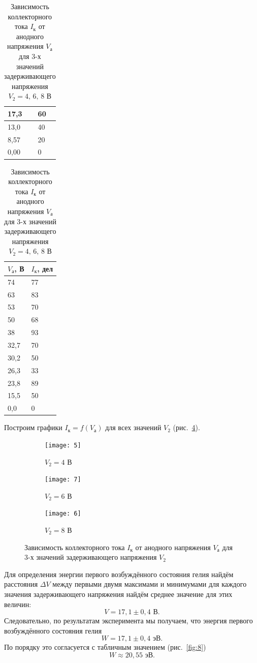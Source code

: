 \documentclass[a4paper]{article}
\begin{document}
\begin{table}[h]
\begin{subtable}[h]{0.25\textwidth}
\begin{tabular}{|l|l|}
17,3 & 60  \\ \hline
13,0   & 40  \\ \hline
8,57 & 20  \\ \hline
0,00    & 0   \\ \hline
\end{tabular}
\caption{$V_2=6 \text{ В}$ }
\end{subtable}
\hfill
\begin{subtable}[h]{0.25\textwidth}
\centering
\begin{tabular}{|l|l|}
\hline
$V_{\text{а}} $, В     & $I_{\text{к}}$, дел    \\ \hline
74   & 77 \\ \hline
63   & 83 \\ \hline
53   & 70 \\ \hline
50   & 68 \\ \hline
38   & 93 \\ \hline
32,7 & 70 \\ \hline
30,2 & 50 \\ \hline
26,3 & 33 \\ \hline
23,8 & 89 \\ \hline
15,5 & 50 \\ \hline
0,0    & 0  \\ \hline
\end{tabular}
\caption{$V_2=8 \text{ В}$ }
\end{subtable}
\caption{Зависимость коллекторного тока $I_{\text{к}}$ от анодного
	напряжения $V_{\text{а}}$ для 3-х значений задерживающего напряжения
$V_2=4,\,6,\,8 \text{ В}$}
\label{tab:1}
\end{table}
Построим графики $I_{\text{к}}=f(V_{\text{а}})$ для всех значений
$V_2$ (рис.~\ref{fig:hi}).
\begin{figure}
     \centering
     \begin{subfigure}[b]{0.6\textwidth}
         \centering
         \texttt{[image: 5]}
         \caption{$V_2=4$ В}
         \label{fig:5}
     \end{subfigure}
     \hfill
     \begin{subfigure}[b]{0.6\textwidth}
         \centering
         \texttt{[image: 7]}
         \caption{$V_2=6$ В}
         \label{fig:6}
     \end{subfigure}
     \hfill
     \begin{subfigure}[b]{0.6\textwidth}
         \centering
         \texttt{[image: 6]}
         \caption{$V_2=8$ В}
         \label{fig:7}
     \end{subfigure}
        \caption{Зависимость коллекторного тока $I_{\text{к}}$ от анодного
	напряжения $V_{\text{а}}$ для 3-х значений задерживающего напряжения
$V_2$}
        \label{fig:hi}
\end{figure}
Для определения энергии первого возбуждённого состояния гелия
найдём расстояния $\Delta V$ между первыми двумя максимами
и минимумами для каждого значения задерживающего напряжения
найдём среднее значение для этих величин:
 \[
V = 17,1\pm 0,4 \text{ В}
.\]
Следовательно, по результатам эксперимента мы получаем, что
энергия первого возбуждённого состояния гелия
\[
W= 17,1\pm 0,4 \text{ эВ}
.\]
По порядку это согласуется с табличным значением (рис.~\ref{fig:8})
\[
W \approx 20,55 \text{ эВ}
.\] 
\end{document}
